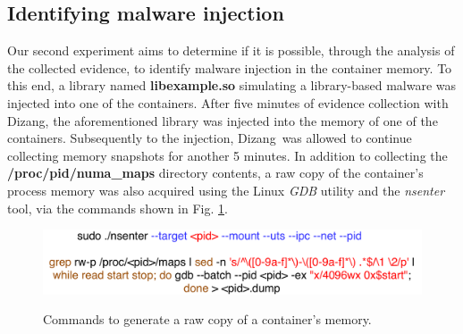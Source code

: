 \documentclass[10pt,journal,compsoc]{IEEEtran}
\newcommand{\marcos}[1]{{\color{green}{MARCOS: #1}}}
\newcommand{\fancyname}{Dizang}
\begin{document}
\subsection{Identifying malware injection}

Our second experiment aims to determine if it is possible, through the analysis of the collected evidence, to identify malware injection in the container memory.
%
To this end, a library named \textbf{libexample.so} simulating a library-based malware was injected into one of the containers.
%
After five minutes of evidence collection with \fancyname, the aforementioned library was injected into the memory of one of the containers. 
%
Subsequently to the injection, \fancyname\ was allowed to continue collecting memory snapshots for another 5 minutes.
%
In addition to collecting the \textbf{/proc/pid/numa\_maps} directory contents, a raw copy of the container's process memory was also acquired using the Linux \textit{GDB} utility and the \textit{nsenter} tool, via the commands shown in Fig. \ref{fig:comando-copia}.



\begin{figure}[htb!]
\footnotesize
\caption{Commands to generate a raw copy of a container's memory.}
\includegraphics[scale=0.40]{comando-copia-memoria-gdb.pdf}
\centering
\label{fig:comando-copia}
\end{figure}
\end{document}
